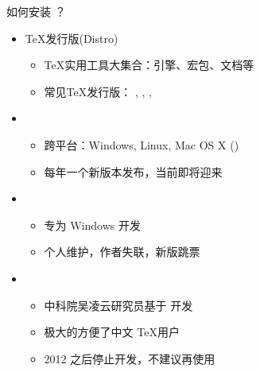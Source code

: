 \begin{frame}{如何安装 ？}
  \begin{itemize}
    \item \TeX{}发行版(Distro)
      \begin{itemize}
        \item \TeX{}实用工具大集合：引擎、宏包、文档等
        \item 常见\TeX{}发行版：
          \alert{\TL}, \CTeX, \MiKTeX, \MacTeX
      \end{itemize}
    \item \TL
      \begin{itemize}
        \item 跨平台：Windows, Linux, Mac OS X (\MacTeX)
        \item 每年一个新版本发布，当前即将迎来 
      \end{itemize}
    \item \MiKTeX
      \begin{itemize}
        \item 专为 Windows 开发
        \item 个人维护，作者失联，新版跳票
      \end{itemize}
    \item \CTeX
      \begin{itemize}
        \item 中科院吴凌云研究员基于 \MiKTeX 开发
        \item 极大的方便了中文 \TeX 用户
        \item 2012 之后停止开发，不建议再使用
      \end{itemize}
  \end{itemize}
\end{frame}

